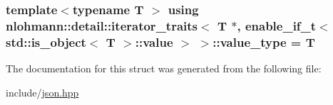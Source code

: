 \subsubsection[{\texorpdfstring{value\+\_\+type}{value_type}}]{\setlength{\rightskip}{0pt plus 5cm}template$<$typename T $>$ using {\bf nlohmann\+::detail\+::iterator\+\_\+traits}$<$ T $\ast$, {\bf enable\+\_\+if\+\_\+t}$<$ std\+::is\+\_\+object$<$ T $>$\+::{\bf value} $>$ $>$\+::{\bf value\+\_\+type} =  T}\hypertarget{structnlohmann_1_1detail_1_1iterator__traits_3_01T_01_5_00_01enable__if__t_3_01std_1_1is__object_3_01T_01_4_1_1value_01_4_01_4_a443e6a62f5fb2c545fc71c751b98ca8d}{}\label{structnlohmann_1_1detail_1_1iterator__traits_3_01T_01_5_00_01enable__if__t_3_01std_1_1is__object_3_01T_01_4_1_1value_01_4_01_4_a443e6a62f5fb2c545fc71c751b98ca8d}


The documentation for this struct was generated from the following file\+:\begin{DoxyCompactItemize}
\item 
include/\hyperlink{json_8hpp}{json.\+hpp}\end{DoxyCompactItemize}
